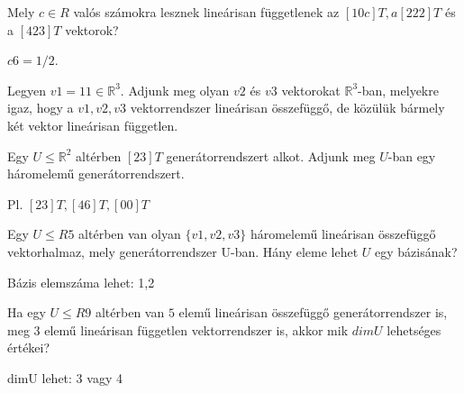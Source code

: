 \begin{frame}
  \begin{tcolorbox}[title={3/4. -R-}]
       Mely $c \in R$ valós számokra lesznek lineárisan függetlenek az $[1 0 c]T, a [2 2 2]T$ és a $[4 2 3]T$ vektorok?
  \tcblower

    \mmedskip 
  
    $c 6= 1/2$.
  \end{tcolorbox}
\end{frame}


\begin{frame}
  \begin{tcolorbox}[title={3/5. -R-}]
       Legyen $v1 = 1 1  \in \mathbb{R}^3$. Adjunk meg olyan $v2$ és $v3$ vektorokat $\mathbb{R}^3$-ban, melyekre igaz, hogy a $v1,v2,v3$ vektorrendszer lineárisan összefüggő, de közülük bármely két vektor lineárisan független.
  \tcblower

    \mmedskip 
  

  \end{tcolorbox}
\end{frame}


\begin{frame}
  \begin{tcolorbox}[title={3/6. -N-}]
        Egy $U ≤ \mathbb{R}^2$ altérben $[2 3]T$ generátorrendszert alkot. Adjunk meg $U$-ban egy háromelemű generátorrendszert.
  \tcblower

    \mmedskip 
  
     Pl. $[2 3]T, [4 6]T, [0 0]T$
  \end{tcolorbox}
\end{frame}


\begin{frame}
  \begin{tcolorbox}[title={3/7. -R-}]
    Egy $U ≤ R5$ altérben van olyan $\{v1,v2,v3\}$ háromelemű lineárisan összefüggő vektorhalmaz, mely generátorrendszer U-ban. Hány eleme lehet $U$ egy bázisának?
  \tcblower

    \mmedskip 
  
     Bázis elemszáma lehet: 1,2
  \end{tcolorbox}
\end{frame}


\begin{frame}
  \begin{tcolorbox}[title={3/8. -R-}]
    Ha egy $U ≤ R9$ altérben van $5$ elemű lineárisan összefüggő generátorrendszer is, meg $3$ elemű lineárisan független vektorrendszer is, akkor mik $dimU$ lehetséges értékei?

  \tcblower

    \mmedskip 
  
     dimU lehet: 3 vagy 4
  \end{tcolorbox}
\end{frame}


